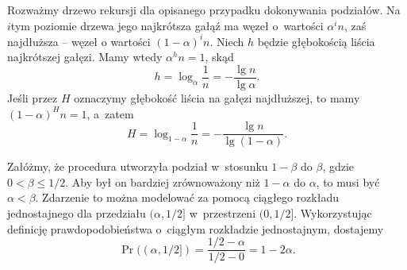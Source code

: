 \exercise %
Rozważmy drzewo rekursji dla opisanego przypadku dokonywania podziałów.
Na $i$\nbhyphen tym poziomie drzewa jego najkrótsza gałąź ma węzeł o~wartości $\alpha^in$, zaś najdłuższa -- węzeł o wartości $(1-\alpha)^in$.
Niech $h$ będzie głębokością liścia najkrótszej gałęzi.
Mamy wtedy $\alpha^hn=1$, skąd
\[
	h = \log_\alpha\frac{1}{n} = -\frac{\lg n}{\lg\alpha}.
\]
Jeśli przez $H$ oznaczymy głębokość liścia na gałęzi najdłuższej, to mamy $(1-\alpha)^Hn=1$, a~zatem
\[
	H = \log_{1-\alpha}\frac{1}{n} = -\frac{\lg n}{\lg(1-\alpha)}.
\]

\exercise %
Załóżmy, że procedura  utworzyła podział w~stosunku $1-\beta$ do $\beta$, gdzie $0<\beta\le1/2$.
Aby był on bardziej zrównoważony niż $1-\alpha$ do $\alpha$, to musi być $\alpha<\beta$.
Zdarzenie to można modelować za pomocą ciągłego rozkładu jednostajnego dla przedziału $(\alpha,1/2]$ w~przestrzeni $(0,1/2]$.
Wykorzystując definicję prawdopodobieństwa o~ciągłym rozkładzie jednostajnym, dostajemy
\[
	\Pr((\alpha,1/2]) = \frac{1/2-\alpha}{1/2-0} = 1-2\alpha.
\]
